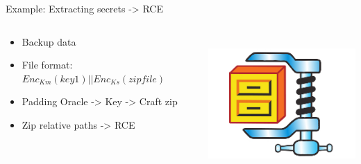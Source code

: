 \documentclass[10pt, compress]{beamer}
\begin{document}
\begin{frame}{Example: Extracting secrets -> RCE}
\begin{columns}
    \begin{column}{0.55\textwidth}
     \begin{itemize}
        \item Backup data
        \item File format: \( Enc_{Km}(key1)||Enc_{Ks}(zipfile) \)
        \item Padding Oracle -> Key -> Craft zip
        \item Zip relative paths -> RCE
      \end{itemize}
    \end{column}
    \begin{column}{0.45\textwidth}
      \\
      \includegraphics[width=\textwidth]{images/WinZip_thumb.jpg} \\
    \end{column}
  \end{columns}



\end{frame}
\end{document}
